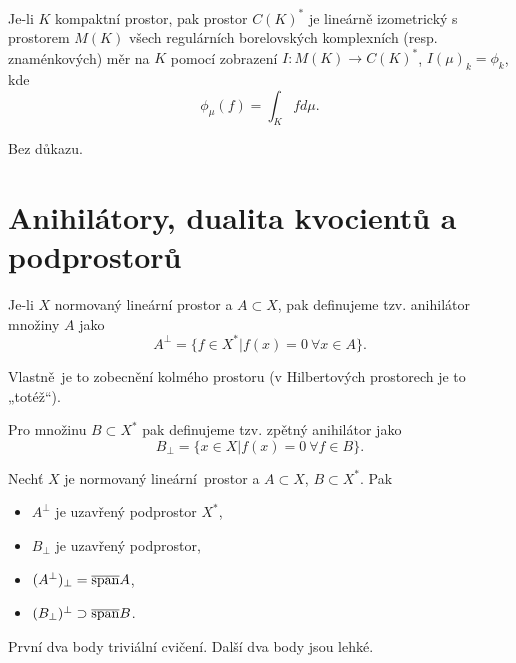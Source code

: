 \documentclass[12pt]{article}					%
\begin{document}
\begin{veta}
	Je-li $K$ kompaktní prostor, pak prostor $C(K)^*$ je lineárně izometrický s prostorem $M(K)$ všech regulárních borelovských komplexních (resp. znaménkových) měr na $K$ pomocí zobrazení $I: M(K) \rightarrow C(K)^*$, $I(\mu)_k = \phi_k$, kde
	$$ \phi_{\mu}(f) = \int_K f d\mu. $$

	\begin{dukazin}
		Bez důkazu.
	\end{dukazin}
\end{veta}

\section{Anihilátory, dualita kvocientů a podprostorů}
\begin{definice}
	Je-li $X$ normovaný lineární prostor a $A \subset X$, pak definujeme tzv. anihilátor množiny $A$ jako
	$$ A^\perp = \{f \in X^* | f(x) = 0\ \forall x \in A\}. $$

	\begin{poznamka}
		Vlastně je to zobecnění kolmého prostoru (v Hilbertových prostorech je to „totéž“).
	\end{poznamka}

	Pro množinu $B \subset X^*$ pak definujeme tzv. zpětný anihilátor jako
	$$ B_\perp = \{x \in X | f(x) = 0\ \forall f \in B\}. $$
\end{definice}

\begin{lemma}
	Nechť $X$ je normovaný lineární prostor a $A \subset X$, $B \subset X^*$. Pak

	\begin{itemize}
		\item $A^\perp$ je uzavřený podprostor $X^*$,
		\item $B_\perp$ je uzavřený podprostor,
		\item $(A^\perp)_\perp = \overline{\operatorname{span}}A$,
		\item $(B_\perp)^\perp \supset \overline{\operatorname{span}}B$.
	\end{itemize}

	\begin{dukazin}
		První dva body triviální cvičení. Další dva body jsou lehké.
	\end{dukazin}
\end{lemma}
\end{document}

